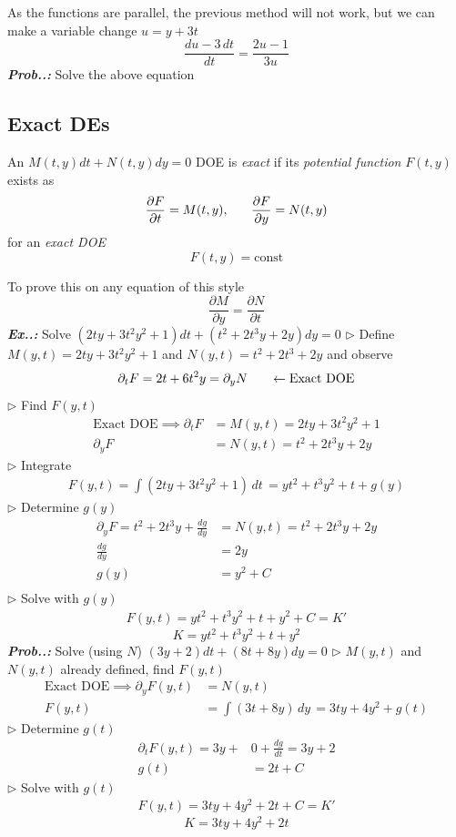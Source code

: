 \documentclass[a4paper]{article}
\begin{document}
As the functions are parallel, the previous method will not work, but we can make a variable change $u=y+3t$
$$
\boxed{\frac{du-3\,dt}{dt}=\frac{2u-1}{3u}}
$$
\vspace{2ex}\textit{\textbf{Prob.\thesection.\theprob:}} Solve the above equation

\subsection{Exact DEs}
An $M(t,y)dt+N(t,y)dy=0$ DOE is \textit{exact} if its \textit{potential function} $F(t,y)$ exists as
$$
\frac{\partial F}{\partial t}=M(t,y),\hspace{4ex} \frac{\partial F}{\partial y}=N(t,y)
$$
for an \textit{exact DOE} 
$$
F(t,y)=\text{const}
$$

To prove this on any equation of this style
$$
\frac{\partial M}{\partial y}=\frac{\partial N}{\partial t}
$$
\vspace{2ex}\textbf{\textit{Ex.\thesection.\theex: }}Solve $(2ty+3t^{2}y^{2}+1)dt+(t^{2}+2t^{3}y+2y)dy=0$ 
$\triangleright$ Define $M(y,t)=2ty+3t^{2}y^{2}+1$ and $N(y,t)=t^{2}+2t^{3}+2y$ and observe
$$
\partial_{t}F=2t+6t^{2}y=\partial_{y}N\hspace{4ex}\leftarrow\text{Exact DOE}
$$
$\triangleright$ Find $F(y,t)$
\begin{align}
\text{Exact DOE}\implies \partial _{t}F&=M(y,t)=2ty+3t^{2}y^{2}+1 \\
\partial_{y}F&=N(y,t)=t^{2}+2t^{3}y+2y
\end{align}
$\triangleright$ Integrate
\begin{align}
F(y,t)=\int (2ty+3t^{2}y^{2}+1) \, dt\, =yt^{2}+t^{3}y^{2}+t+g(y)
\end{align}
$\triangleright$ Determine $g(y)$
\begin{align}
\partial_{y}F=t^{2}+2t^{3}y+\frac{dg}{dy}&=N(y,t)=t^{2}+2t^{3}y+2y \\
\frac{dg}{dy}&=2y \\
g(y)&=y^{2}+C \\
\end{align}
$\triangleright$ Solve with $g(y)$
\begin{align}
F(y,t)=yt^{2}+t^{3}y^{2}+t+y^{2}+C=K'
\end{align}
$$
\boxed{K=yt^{2}+t^{3}y^{2}+t+y^{2}}
$$
\vspace{2ex}\textbf{\textit{Prob.\thesection.\theprob: }}Solve (using $N$) $(3y+2)dt+(8t+8y)dy=0$
$\triangleright$ $M(y,t)$ and $N(y,t)$ already defined, find $F(y,t)$ 
\begin{align}
\text{Exact DOE}\implies \partial_{y}F(y,t)&=N(y,t) \\
F(y,t)&=\int (3t+8y) \, dy\, =3ty+4y^{2}+g(t)
\end{align}
$\triangleright$ Determine $g(t)$
\begin{align}
\partial_{t}F(y,t)=3y+&0+\frac{dg}{dt}=3y+2 \\
g(t)&=2t+C
\end{align}
$\triangleright$ Solve with $g(t)$ 
\begin{align}
F(y,t)=3ty+4y^{2}+2t+C=K'
\end{align}
$$
\boxed{K=3ty+4y^{2}+2t}
$$
\end{document}
